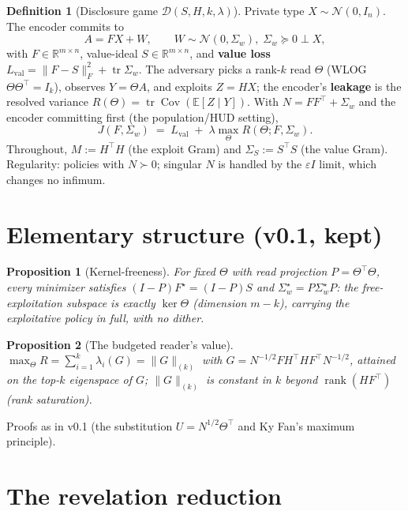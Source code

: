 \documentclass[11pt]{article}
\newtheorem{proposition}{Proposition}
\theoremstyle{definition}
\newtheorem{definition}{Definition}
\newcommand{\tr}{\operatorname{tr}}
\newcommand{\KF}[1]{\lVert #1 \rVert_{(k)}}
\begin{document}
\begin{definition}[Disclosure game $\mathcal{D}(S,H,k,\lambda)$]
\label{def:game}
Private type $X\sim\mathcal N(0,I_n)$. The encoder commits to
\[
A = F X + W, \qquad W\sim\mathcal N(0,\Sigma_w),\;
\Sigma_w\succeq 0 \perp X,
\]
with $F\in\mathbb R^{m\times n}$, value-ideal $S\in\mathbb
R^{m\times n}$, and \textbf{value loss}
$L_{\mathrm{val}} = \lVert F-S\rVert_F^2 + \tr\Sigma_w$. The
adversary picks a rank-$k$ read $\Theta$ (WLOG
$\Theta\Theta^\top=I_k$), observes $Y=\Theta A$, and exploits
$Z=HX$; the encoder's \textbf{leakage} is the resolved variance
$R(\Theta) = \tr\operatorname{Cov}(\mathbb E[Z\mid Y])$. With
$N = FF^\top+\Sigma_w$ and the encoder committing first (the
population/HUD setting),
\[
J(F,\Sigma_w) \;=\; L_{\mathrm{val}}
\;+\; \lambda \max_{\Theta} R(\Theta;F,\Sigma_w).
\]
Throughout, $M := H^\top H$ (the exploit Gram) and
$\Sigma_S := S^\top S$ (the value Gram). Regularity: policies with
$N\succ0$; singular $N$ is handled by the $\varepsilon I$ limit,
which changes no infimum.
\end{definition}

\section{Elementary structure (v0.1, kept)}

\begin{proposition}[Kernel-freeness]\label{prop:kernel}
For fixed $\Theta$ with read projection $P=\Theta^\top\Theta$, every
minimizer satisfies $(I-P)F^\star = (I-P)S$ and
$\Sigma_w^\star = P\Sigma_w^\star P$: the free-exploitation subspace
is exactly $\ker\Theta$ (dimension $m-k$), carrying the exploitative
policy in full, with no dither.
\end{proposition}

\begin{proposition}[The budgeted reader's value]\label{prop:kyfan}
$\max_\Theta R = \sum_{i=1}^k \lambda_i(G) = \KF{G}$ with
$G = N^{-1/2}FH^\top H F^\top N^{-1/2}$, attained on the top-$k$
eigenspace of $G$; $\KF{G}$ is constant in $k$ beyond
$\operatorname{rank}(HF^\top)$ (rank saturation).
\end{proposition}

Proofs as in v0.1 (the substitution $U = N^{1/2}\Theta^\top$ and Ky
Fan's maximum principle).

\section{The revelation reduction}
\end{document}
